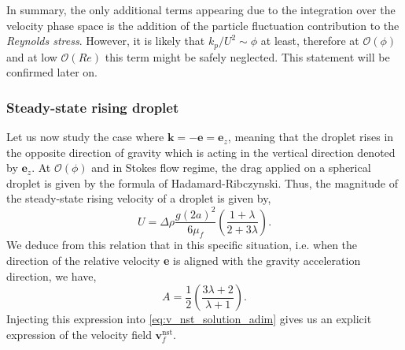 In summary, the only additional terms appearing due to the integration over the velocity phase space is the addition of the particle fluctuation contribution to the \textit{Reynolds stress}. 
However, it is likely that $k_p/U^2 \sim \phi$ at least, therefore at $\mathcal{O}(\phi)$ and at low $\mathcal{O}(Re)$ this term might be safely neglected. 
This statement will be confirmed later on. 



\subsubsection{Steady-state rising droplet}

Let us now study the case where $\textbf{k} = - \textbf{e} = \textbf{e}_z$, meaning that the droplet rises in the opposite direction of gravity which is acting in the vertical direction denoted by $\textbf{e}_z$.  
At $\mathcal{O}(\phi)$ and in Stokes flow regime, the drag applied on a spherical droplet is given by the formula of Hadamard-Ribczynski.
Thus, the magnitude of the steady-state rising velocity of a droplet is given by, 
\begin{equation}
    U = \Delta \rho \frac{g (2a)^2}{6 \mu_f }\left(\frac{1+\lambda}{2+3\lambda}\right).
    \label{eq:U_isolated}
\end{equation}
We deduce from this relation that in this specific situation, i.e. when the direction of the relative velocity \textbf{e} is aligned with the gravity acceleration direction, we have, 
\begin{equation}
    A = \frac{1}{2}\left(\frac{3\lambda +2}{\lambda +1}\right). 
    \label{eq:closure_A}
\end{equation}
Injecting this expression into \ref{eq:v_nst_solution_adim} gives us an explicit expression of the velocity field $\textbf{v}^\text{nst}_f$. 

